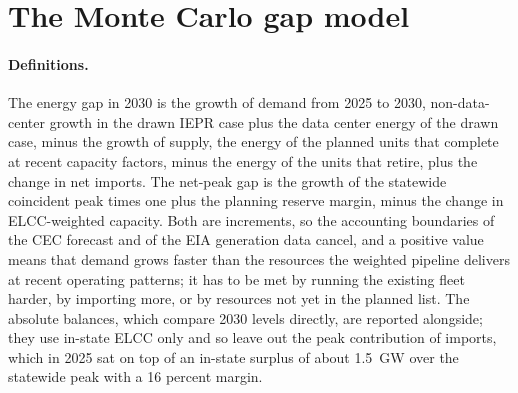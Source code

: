 \begin{table}[H]
\centering\footnotesize
\caption{Probability (percent) of energization within 60 months by starting phase, from the Markov chain with the estimated hazards, with every hazard scaled 1, 2 and 3 times and with a monthly cancellation hazard of 0 or 0.5 percent in the pre-approval phases.}
\label{tab:ercotchain}
\resizebox{\textwidth}{!}{}
\end{table}

\section{The Monte Carlo gap model}
\label{sec:mc}

\paragraph{Definitions.} The energy gap in 2030 is the growth of demand from 2025 to 2030, non-data-center growth in the drawn IEPR case plus the data center energy of the drawn case, minus the growth of supply, the energy of the planned units that complete at recent capacity factors, minus the energy of the units that retire, plus the change in net imports. The net-peak gap is the growth of the statewide coincident peak times one plus the planning reserve margin, minus the change in ELCC-weighted capacity. Both are increments, so the accounting boundaries of the CEC forecast and of the EIA generation data cancel, and a positive value means that demand grows faster than the resources the weighted pipeline delivers at recent operating patterns; it has to be met by running the existing fleet harder, by importing more, or by resources not yet in the planned list. The absolute balances, which compare 2030 levels directly, are reported alongside; they use in-state ELCC only and so leave out the peak contribution of imports, which in 2025 sat on top of an in-state surplus of about 1.5~GW over the statewide peak with a 16 percent margin.

